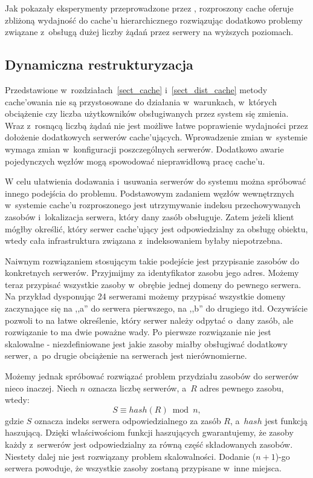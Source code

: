 \documentclass[a4paper,11pt]{scrartcl}
\newcommand{\s}{ }
\newcommand{\kesz}{cache}
\newcommand{\keszu}{cache'u}
\newcommand{\keszujacy}{cache'ujący}
\newcommand{\keszujacych}{cache'ujących}
\newcommand{\keszowania}{cache'owania}
\begin{document}
Jak pokazały eksperymenty przeprowadzone przez \cite{povey1997distributed}, rozproszony \kesz\s oferuje zbliżoną wydajność do \keszu\s hierarchicznego rozwiązując dodatkowo problemy związane z~obsługą dużej liczby żądań przez serwery na wyższych poziomach.

\subsection{Dynamiczna restrukturyzacja}
Przedstawione w~rozdziałach~\ref{sect_cache} i~\ref{sect_dist_cache} metody \keszowania\s nie są przystosowane do działania w~warunkach, w~których obciążenie czy liczba użytkowników obsługiwanych przez system się zmienia. Wraz z~rosnącą liczbą żądań nie jest możliwe łatwe poprawienie wydajności przez dołożenie dodatkowych serwerów \keszujacych. Wprowadzenie zmian w~systemie wymaga zmian w~konfiguracji poszczególnych serwerów. Dodatkowo awarie pojedynczych węzłów mogą spowodować nieprawidłową pracę \keszu.

W celu ułatwienia dodawania i~usuwania serwerów do systemu można spróbować innego podejścia do problemu. Podstawowym zadaniem węzłów wewnętrznych w~systemie \keszu\s rozproszonego jest utrzymywanie indeksu przechowywanych zasobów i~lokalizacja serwera, który dany zasób obsługuje. Zatem jeżeli klient mógłby określić, który serwer \keszujacy\s jest odpowiedzialny za obsługę obiektu, wtedy cała infrastruktura związana z~indeksowaniem byłaby niepotrzebna.

Naiwnym rozwiązaniem stosującym takie podejście jest przypisanie zasobów do konkretnych serwerów. Przyjmijmy za identyfikator zasobu jego adres. Możemy teraz przypisać wszystkie zasoby w~obrębie jednej domeny do pewnego serwera. Na przykład dysponując 24 serwerami możemy przypisać wszystkie domeny zaczynające się na ,,a'' do serwera pierwszego, na ,,b'' do drugiego itd. Oczywiście pozwoli to na łatwe określenie, który serwer należy odpytać o~dany zasób, ale rozwiązanie to ma dwie poważne wady. Po pierwsze rozwiązanie nie jest skalowalne - niezdefiniowane jest jakie zasoby miałby obsługiwać dodatkowy serwer, a~po drugie obciążenie na serwerach jest nierównomierne.

Możemy jednak spróbować rozwiązać problem przydziału zasobów do serwerów nieco inaczej. Niech $n$ oznacza liczbę serwerów, a~$R$ adres pewnego zasobu, wtedy:
\begin{equation*}
S \equiv hash(R) \bmod n,
\end{equation*}
 gdzie $S$ oznacza indeks serwera odpowiedzialnego za zasób $R$, a~$hash$ jest funkcją haszującą. Dzięki właściwościom funkcji haszujących gwarantujemy, że zasoby każdy z~serwerów jest odpowiedzialny za równą część składowanych zasobów. Niestety dalej nie jest rozwiązany problem skalowalności. Dodanie ($n+1$)-go serwera powoduje, że wszystkie zasoby zostaną przypisane w~inne miejsca.
 
\end{document}
